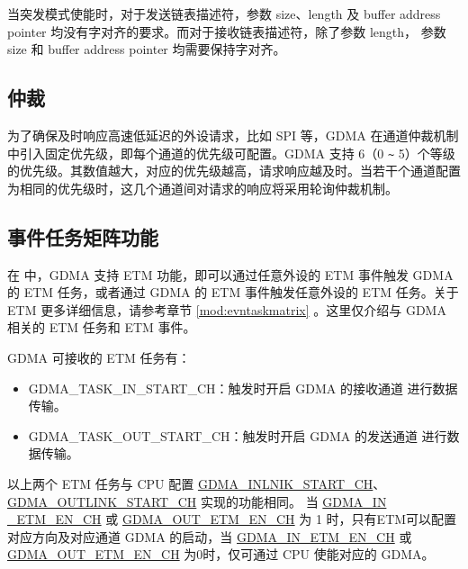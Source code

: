 \documentclass[main\_\_CN.tex]{subfiles}
\begin{document}
当突发模式使能时，对于发送链表描述符，参数 size、length 及 buffer address pointer 均没有字对齐的要求。而对于接收链表描述符，除了参数 length， 参数 size 和 buffer address pointer 均需要保持字对齐。


\subsection{仲裁}

为了确保及时响应高速低延迟的外设请求，比如 SPI 等，GDMA 在通道仲裁机制中引入固定优先级，即每个通道的优先级可配置。GDMA 支持 6（0 \verb+~+ 5）个等级的优先级。其数值越大，对应的优先级越高，请求响应越及时。当若干个通道配置为相同的优先级时，这几个通道间对请求的响应将采用轮询仲裁机制。




\subsection{事件任务矩阵功能} \label{sec:dma-etm-func}




在 \chipname{} 中，GDMA 支持 ETM 功能，即可以通过任意外设的 ETM 事件触发 GDMA 的 ETM 任务，或者通过 GDMA 的 ETM 事件触发任意外设的 ETM 任务。关于 ETM 更多详细信息，请参考章节 \ref{mod:evntaskmatrix} 。这里仅介绍与 GDMA 相关的 ETM 任务和 ETM 事件。


GDMA 可接收的 ETM 任务有：

\begin{itemize}
\item GDMA\_TASK\_IN\_START\_CH：触发时开启 GDMA 的接收通道  进行数据传输。
\item GDMA\_TASK\_OUT\_START\_CH：触发时开启 GDMA 的发送通道  进行数据传输。
\end{itemize}

\begin{tiplisting}
以上两个 ETM 任务与 CPU 配置 \hyperref[fielddesc:GDMAINLINKSTARTCHN]{GDMA\_INLNIK\_START\_CH}、\hyperref[fielddesc:GDMAOUTLINKSTARTCHN]{GDMA\_OUTLINK\_START\_CH} 实现的功能相同。 当 \hyperref[fielddesc:GDMAINETMENCHN]{GDMA\_IN\\\_ETM\_EN\_CH} 或 \hyperref[fielddesc:GDMAOUTETMENCHN]{GDMA\_OUT\_ETM\_EN\_CH} 为 1 时，只有ETM可以配置对应方向及对应通道 GDMA 的启动，当 \hyperref[fielddesc:GDMAINETMENCHN]{GDMA\_IN\_ETM\_EN\_CH} 或 \hyperref[fielddesc:GDMAOUTETMENCHN]{GDMA\_OUT\_ETM\_EN\_CH} 为0时，仅可通过 CPU 使能对应的 GDMA。
\end{tiplisting}
\end{document}
